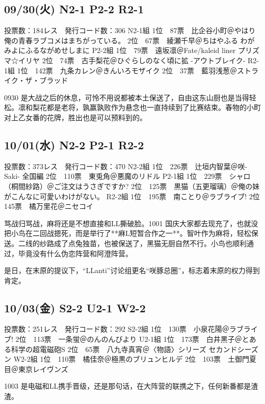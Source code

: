 \subsection{09/30(火) N2-1 P2-2 R2-1}

	投票数：184レス　発行コード数：306
	N2-1組
	1位　87票　比企谷小町＠やはり俺の青春ラブコメはまちがっている。
	2位　67票　綾瀬千早＠ちはやふる わがみよにふるながめせしまに
	P2-2組
	1位　79票　遠坂凛＠Fate/kaleid liner プリズマ☆イリヤ
	2位　74票　古手梨花＠ひぐらしのなく頃に拡 -アウトブレイク-
	R2-1組
	1位　142票　九条カレン＠きんいろモザイク
	2位　37票　藍羽浅葱＠ストライク・ザ・ブラッド

0930 是大战之后的休息，可怜不用说都被本土保送了，自由这东山厨也是当得轻松。凛和梨花都是老将，孰赢孰败作为悬念也一直持续到了比赛结束。春物的小町对上乙女番的花牌，胜出也是可以预料到的。

\subsection{10/01(水) N2-2 P2-1 R2-2}

	投票数：373レス　発行コード数：470
	N2-2組
	1位　226票　辻垣内智葉＠咲-Saki- 全国編
	2位　110票　東兎角＠悪魔のリドル
	P2-1組
	1位　229票　シャロ（桐間紗路）＠ご注文はうさぎですか?
	2位　125票　黒猫（五更瑠璃）＠俺の妹がこんなに可愛いわけがない。
	R2-2組
	1位　195票　南ことり＠ラブライブ!
	2位　145票　橘万里花＠ニセコイ

骂战归骂战，麻将还是不想直接和LL撕破脸。1001 国庆大家都去现充了，也就没把小鸟在二回战摁死，而是举行了**麻L短暂合作之一**。智叶作为麻将，轻松保送。二线的纱路成了点兔独苗，也被保送了，黑猫无厨自然不行。小鸟也顺利通过，毕竟没有什么伪恋阵营和阿澄阵营。

是日，在末原的提议下，“LLanti”讨论组更名“咲豚总圈”，标志着末原的权力得到肯定。

\subsection{10/03(金) S2-2 U2-1 W2-2}

	投票数：251レス　発行コード数：292
	S2-2組
	1位　130票　小泉花陽＠ラブライブ!
	2位　113票　一条蛍＠のんのんびより
	U2-1組
	1位　173票　白井黒子＠とある科学の超電磁砲S
	2位　65票　八九寺真宵＠〈物語〉シリーズ セカンドシーズン
	W2-2組
	1位　110票　橘佳奈＠極黒のブリュンヒルデ
	2位　103票　土御門夏目＠東京レイヴンズ

1003 是电磁和LL携手晋级，还是那句话，在大阵营的联携之下，任何新番都是渣渣。


